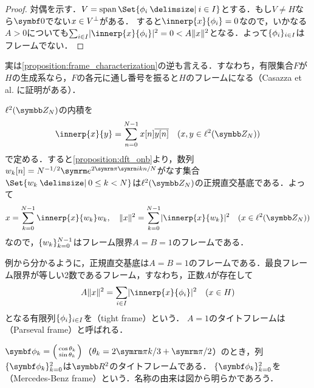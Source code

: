 \documentclass[../../main]{subfiles}
\begin{document}
\begin{proof}
  対偶を示す．\(V=\spannedby\Set{\phi_i\given i\in I}\)とする．もし\(V\neq H\)なら\(\zvec\)でない\(x\in\pcomp{V}\)がある．
  すると\(\innerp{x}{\phi_i}=0\)なので，いかなる\(A>0\)についても\(\sum_{i\in I}\abs{\innerp{x}{\phi_i}}^2=0<A\vnorm{x}^2\)となる．よって\(\lbrace\phi_i\rbrace_{i\in I}\)はフレームでない．
\end{proof}

\begin{note}
  実は\cref{proposition:frame_characterization}の逆も言える．すなわち，有限集合\(F\)が\(H\)の生成系なら，\(F\)の各元に通し番号を振ると\(H\)のフレームになる（Casazza et al. \cite{casazza2013}に証明がある）．
\end{note}

\begin{example}
  \(\cycles{N}\)の内積を
  \[
    \innerp{x}{y} = \sum_{n=0}^{N-1}x[n]\conj*{y[n]}\quad(x,y\in\cycles{N})
  \]
  で定める．すると\cref{proposition:dft_onb}より，数列\(w_k[n]=N^{-1/2}\napr^{2\krez\iuni kn/N}\)がなす集合\(\Set{w_k\given 0\leq k<N}\)は\(\cycles{N}\)の正規直交基底である．よって
  \[
    x = \sum_{k=0}^{N-1}\innerp{x}{w_k}w_k,
    \quad\vnorm{x}^2 = \sum_{k=0}^{N-1}\abs{\innerp{x}{w_k}}^2\quad(x\in\cycles{N})
  \]
  なので，\(\lbrace w_k\rbrace_{k=0}^{N-1}\)はフレーム限界\(A=B=1\)のフレームである．
\end{example}

例から分かるように，正規直交基底は\(A=B=1\)のフレームである．最良フレーム限界が等しい2数であるフレーム，すなわち，正数\(A\)が存在して
\[
  A\vnorm{x}^2 = \sum_{i\in I}\abs{\innerp{x}{\phi_i}}^2\quad(x\in H)
\]
となる有限列\(\lbrace\phi_i\rbrace_{i\in I}\)を（tight frame）という．
\(A=1\)のタイトフレームは（Parseval frame）と呼ばれる．

\begin{example}
  \(\vect{\phi}_k=\smallmatrice{\cos\theta_k \\ \sin\theta_k}\)（\(\theta_k=2\krez k/3+\krez/2\)）のとき，列\(\seq{\vect{\phi}_k}_{k=0}^2\)は\(\numset{R}^2\)のタイトフレームである．
  \(\seq{\vect{\phi}_k}_{k=0}^2\)を（Mercedes‐Benz frame）という\cite{casazza2013}．名称の由来は図から明らかであろう．
\end{example}
\end{document}
